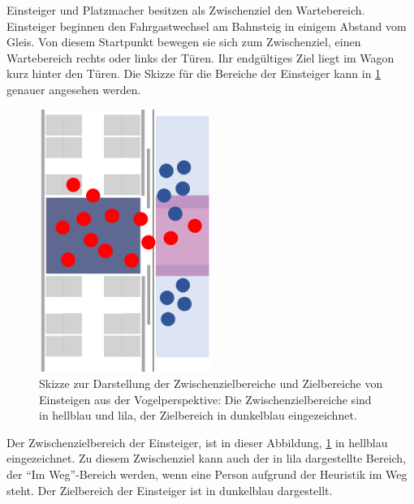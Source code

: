 Einsteiger und Platzmacher besitzen als Zwischenziel den Wartebereich. Einsteiger beginnen den Fahrgastwechsel am Bahnsteig in einigem Abstand vom Gleis. Von diesem Startpunkt bewegen sie sich zum Zwischenziel, einen Wartebereich rechts oder links der Türen. Ihr endgültiges Ziel liegt im Wagon kurz hinter den Türen.
Die Skizze für die Bereiche der Einsteiger kann in \figurename \ref{fig:SkizzeEinsteiger} genauer angesehen werden.
\begin{figure}[H]
	\centering
		\includegraphics[angle=270, width=0.5\textwidth]{pictures/model/kognitive_heuristic_model/boarding_sketch.png}
	\caption{Skizze zur Darstellung der Zwischenzielbereiche und Zielbereiche von Einsteigen aus der Vogelperspektive: Die Zwischenzielbereiche sind in hellblau und lila, der Zielbereich in dunkelblau eingezeichnet.}
	\label{fig:SkizzeEinsteiger}
\end{figure} 
Der Zwischenzielbereich der Einsteiger, ist in dieser Abbildung, \figurename \ref{fig:SkizzeEinsteiger} in hellblau eingezeichnet. Zu diesem Zwischenziel kann auch der in lila dargestellte Bereich, der "`Im Weg"'-Bereich werden, wenn eine Person aufgrund der Heuristik im Weg steht. Der Zielbereich der Einsteiger ist in dunkelblau dargestellt.

